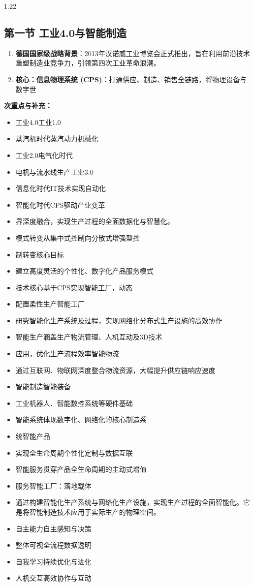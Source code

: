 \documentclass[12pt,a4paper]{article}
\begin{document}
\begin{spacing}{1.22}
\subsection{第一节 工业4.0与智能制造}
\begin{tcolorbox}[colback=yellow!6,colframe=red!55!black,title=重点,left=1mm,right=1mm]
\begin{enumerate}[leftmargin=2.2em,label=\arabic*.]
  \item \textbf{德国国家级战略背景}：2013年汉诺威工业博览会正式推出，旨在利用前沿技术重塑制造业竞争力，引领第四次工业革命浪潮。
  \item \textbf{核心：信息物理系统 (CPS)}：打通供应、制造、销售全链路，将物理设备与数字世
\end{enumerate}
\end{tcolorbox}
\noindent\textbf{次重点与补充：}
\begin{itemize}[leftmargin=2.2em,label=--]
  \item 工业4.0工业1.0
  \item 蒸汽机时代蒸汽动力机械化
  \item 工业2.0电气化时代
  \item 电机与流水线生产工业3.0
  \item 信息化时代IT技术实现自动化
  \item 智能化时代CPS驱动产业变革
  \item 界深度融合，实现生产过程的全面数据化与智慧化。
  \item 模式转变从集中式控制向分散式增强型控
  \item 制转变核心目标
  \item 建立高度灵活的个性化、数字化产品服务模式
  \item 技术核心基于CPS实现智能工厂，动态
  \item 配置柔性生产智能工厂
  \item 研究智能化生产系统及过程，实现网络化分布式生产设施的高效协作
  \item 智能生产涵盖生产物流管理、人机互动及3D技术
  \item 应用，优化生产流程效率智能物流
  \item 通过互联网、物联网深度整合物流资源，大幅提升供应链响应速度
  \item 智能制造智能装备
  \item 工业机器人、智能数控系统等硬件基础
  \item 智能系统体现数字化、网络化的核心制造系
  \item 统智能产品
  \item 实现全生命周期个性化定制与数据互联
  \item 智能服务贯穿产品全生命周期的主动式增值
  \item 服务智能工厂：落地载体
  \item 通过构建智能化生产系统与网络化生产设施，实现生产过程的全面智能化。它是将智能制造技术应用于实际生产的物理空间。
  \item 自主能力自主感知与决策
  \item 整体可视全流程数据透明
  \item 自我学习持续优化与进化
  \item 人机交互高效协作与互动
\end{itemize}


\end{spacing}
\end{document}
